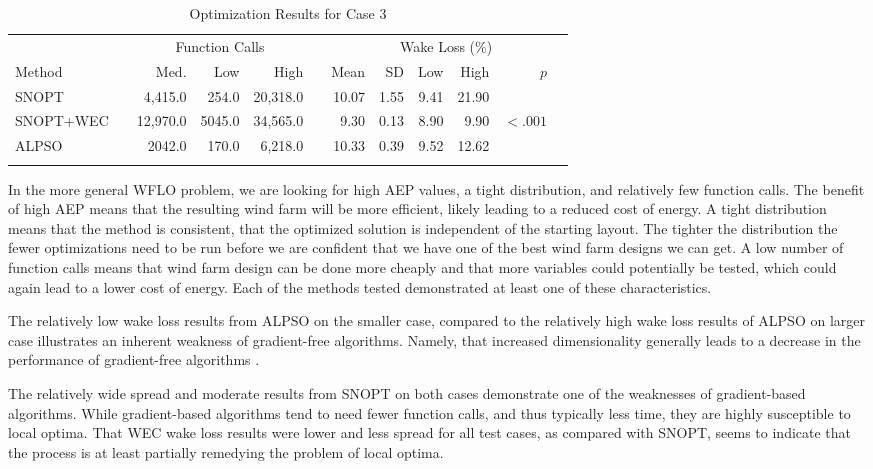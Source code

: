 \documentclass[a4paper]{jpconf}
\begin{document}
%
\begin{table}[h]
	\caption{Optimization Results for Case 3}
	\label{tab:case3}
	\centering
	\begin{tabular}{lcrrrcrrrrrr}
		\br
		& & \multicolumn{3}{c}{Function Calls} &  & \multicolumn{6}{c}{\quad \quad \quad \quad \quad Wake Loss (\%) \quad \quad \quad \quad \quad} \\
		\cline{3-5}\cline{7-12}
		Method  & & Med. & Low & High & & Mean & SD & Low & High & $p$\\
		\cline{1-1}\cline{3-5}\cline{7-12}
		SNOPT  & & 4,415.0 & 254.0 & 20,318.0 & & 10.07 & 1.55 & 9.41 & 21.90 &  \\
		SNOPT+WEC & & 12,970.0 & 5045.0& 34,565.0 &  &  9.30 & 0.13 & 8.90 & 9.90 & $<.001$ \\
	    ALPSO & & 2042.0 & 170.0 & 6,218.0 & & 10.33 & 0.39 & 9.52 & 12.62 &\\
		\br
	\end{tabular}
\end{table}

In the more general WFLO problem, we are looking for high AEP values, a tight distribution, and relatively few function calls. The benefit of high AEP means that the resulting wind farm will be more efficient, likely leading to a reduced cost of energy. A tight distribution means that the method is consistent, that the optimized solution is independent of the starting layout. The tighter the distribution the fewer optimizations need to be run before we are confident that we have one of the best wind farm designs we can get. A low number of function calls means that wind farm design can be done more cheaply and that more variables could potentially be tested, which could again lead to a lower cost of energy. Each of the methods tested demonstrated at least one of these characteristics.

The relatively low wake loss results from ALPSO on the smaller case, compared to the relatively high wake loss results of ALPSO on larger case illustrates an inherent weakness of gradient-free algorithms. Namely, that increased dimensionality generally leads to a decrease in the performance of gradient-free algorithms \cite{rios2013-grad-free-comparison}.

The relatively wide spread and moderate results from SNOPT on both cases demonstrate one of the weaknesses of gradient-based algorithms. While gradient-based algorithms tend to need fewer function calls, and thus typically less time, they are highly susceptible to local optima. That WEC wake loss results were lower and less spread for all test cases, as compared with SNOPT, seems to indicate that the process is at least partially remedying the problem of local optima.
\end{document}
